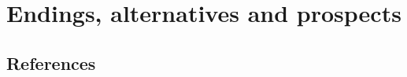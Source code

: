 \part{Endings, alternatives and prospects}
 






\chapter{References}
\printbibliography[heading=none]
\afterpage{\blankpage}







